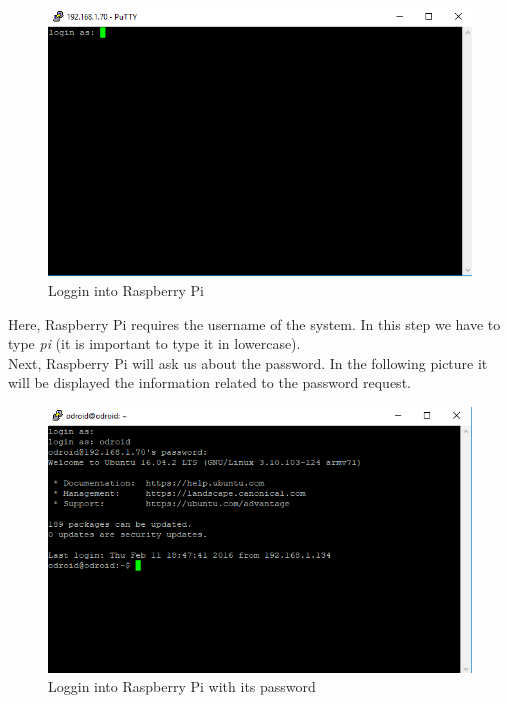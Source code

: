 \begin{figure}[H]
\begin{centering}
\includegraphics[scale=0.8]{IMGS/loggin_putty.PNG}
\caption{Loggin into Raspberry Pi \label{Loggin into Raspberry Pi}}
\end{centering}
\end{figure} 
 
Here, Raspberry Pi requires the username of the system. In this step we have to type \textit{pi} (it is important to type it in lowercase).\\

Next, Raspberry Pi will ask us about the password. In the following picture it will be displayed the information related to the password request.

\begin{figure}[H]
\begin{centering}
\includegraphics[scale=0.8]{IMGS/loggin_putty_pass.PNG}
\caption{Loggin into Raspberry Pi with its password \label{Loggin into Raspberry Pi with its password}}
\end{centering}
\end{figure}
 
